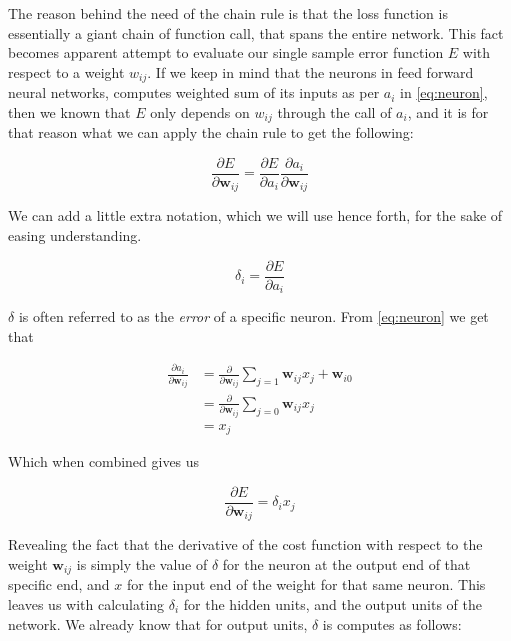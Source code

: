 The reason behind the need of the chain rule is that the loss function is
essentially a giant chain of function call, that spans the entire network. This
fact becomes apparent attempt to evaluate our single sample error function $E$
with respect to a weight $w_{ij}$. If we keep in mind that the neurons in feed
forward neural networks, computes weighted sum of its inputs as per $a_i$ in
\eqref{eq:neuron}, then we known that $E$ only depends on $w_{ij}$ through the
call of $a_i$, and it is for that reason what we can apply the chain rule to get
the following:

\begin{equation}
\frac{\partial E}{\partial \mathbf{w}_{ij}} = \frac{\partial E}{\partial a_i}
\frac{\partial a_i}{\partial \mathbf{w}_{ij}}
\end{equation}

We can add a little extra notation, which we will use hence forth, for the 
sake of easing understanding.

\begin{equation}\label{eq:delta}
\delta_i = \frac{\partial E}{\partial a_i}
\end{equation}

$\delta$ is often referred to as the \textit{error} of a specific neuron.
From \eqref{eq:neuron} we get that 

\begin{align}
\frac{\partial a_i}{\partial \mathbf{w}_{ij}} &= \frac{\partial}{\partial \mathbf{w}_{ij}} 
\sum_{j=1} \mathbf{w}_{ij} x_j + \mathbf{w}_{i0}\\
&= \frac{\partial}{\partial \mathbf{w}_{ij}} \sum_{j = 0} \mathbf{w}_{ij} x_j\\
&= x_j 
\end{align}

Which when combined gives us

\begin{equation}
\label{eq:deriv}
\frac{\partial E}{\partial \mathbf{w}_{ij}} = \delta_i x_j
\end{equation}

Revealing the fact that the derivative of the cost function with respect to the
weight $\mathbf{w}_{ij}$ is simply the value of $\delta$ for the neuron at the
output end of that specific end, and $x$ for the input end of the weight for
that same neuron. This leaves us with calculating $\delta_i$ for the hidden
units, and the output units of the network. We already know that for output
units, $\delta$ is computes as follows:


